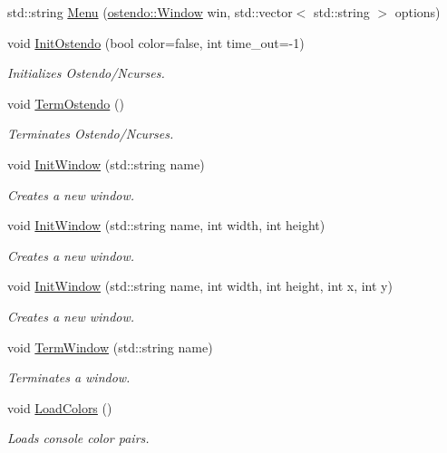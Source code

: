 \begin{DoxyCompactItemize}
std\+::string \hyperlink{namespaceostendo_a7046839a0becea8636f4136c94b4cc31}{Menu} (\hyperlink{classostendo_1_1Window}{ostendo\+::\+Window} win, std\+::vector$<$ std\+::string $>$ options)
\item 
void \hyperlink{namespaceostendo_acada6eef78aaae2a103761e6b3122a7c}{Init\+Ostendo} (bool color=false, int time\+\_\+out=-\/1)
\begin{DoxyCompactList}\small\item\em Initializes Ostendo/\+Ncurses. \end{DoxyCompactList}\item 
void \hyperlink{namespaceostendo_ae151d449ffec660866ee7c8ac75892da}{Term\+Ostendo} ()
\begin{DoxyCompactList}\small\item\em Terminates Ostendo/\+Ncurses. \end{DoxyCompactList}\item 
void \hyperlink{namespaceostendo_a47ee72208333eea02c3737d540d0267b}{Init\+Window} (std\+::string name)
\begin{DoxyCompactList}\small\item\em Creates a new window. \end{DoxyCompactList}\item 
void \hyperlink{namespaceostendo_a9a1f177f0bc76d81901078af708114f6}{Init\+Window} (std\+::string name, int width, int height)
\begin{DoxyCompactList}\small\item\em Creates a new window. \end{DoxyCompactList}\item 
void \hyperlink{namespaceostendo_a471c4077531c8fd99d79c1faf7a0d09e}{Init\+Window} (std\+::string name, int width, int height, int x, int y)
\begin{DoxyCompactList}\small\item\em Creates a new window. \end{DoxyCompactList}\item 
void \hyperlink{namespaceostendo_a8d3e9d8ec26e75c7fd77ef392ecd6e06}{Term\+Window} (std\+::string name)
\begin{DoxyCompactList}\small\item\em Terminates a window. \end{DoxyCompactList}\item 
void \hyperlink{namespaceostendo_a892fb62097748762befae0441bcc4f0a}{Load\+Colors} ()
\begin{DoxyCompactList}\small\item\em Loads console color pairs. \end{DoxyCompactList}\item 

\end{DoxyCompactItemize}
